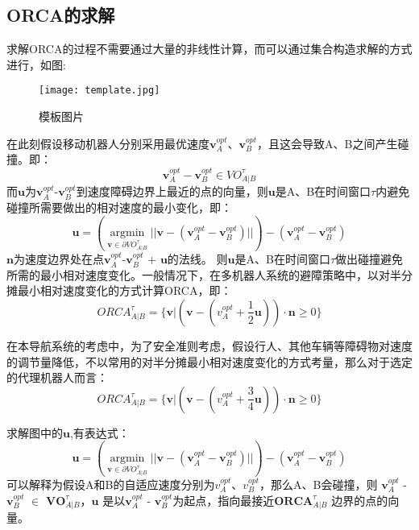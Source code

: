 \subsection{ORCA的求解}
求解ORCA的过程不需要通过大量的非线性计算，而可以通过集合构造求解的方式进行，如图:
\begin{figure}[ht]
    \centering
    \texttt{[image: template.jpg]}
    \caption{模板图片}
\end{figure}
在此刻假设移动机器人分别采用最优速度$\symbf{v}_A^{opt}$、$\symbf{v}_B^{opt}$，且这会导致A、B之间产生碰撞。即：
\begin{equation}
    \symbf{v}_A^{opt} - \symbf{v}_B^{opt} \in  VO^\tau_{A|B}
\end{equation}
而$\symbf{u}$为$\symbf{v}_A^{opt}$-$\symbf{v}_B^{opt}$到速度障碍边界上最近的点的向量，则$\symbf{u}$是A、B在时间窗口$\tau$内避免碰撞所需要做出的相对速度的最小变化，即：
\begin{equation}
    \symbf{u} = ( \mathop{\arg\min}\limits_{\symbf{v} \in \partial VO^\tau_{A|B}} || \symbf{v} - (\symbf{v}_A^{opt}-\symbf{v}_B^{opt})||) - (\symbf{v}_A^{opt}-\symbf{v}_B^{opt})
\end{equation}
$\symbf{n}$为速度边界处在点$\symbf{v}_A^{opt}$-$\symbf{v}_B^{opt}$ + $\symbf{u}$的法线。
则$\symbf{u}$是A、B在时间窗口$\tau$做出碰撞避免所需的最小相对速度变化。一般情况下，在多机器人系统的避障策略中，以对半分摊最小相对速度变化的方式计算ORCA，即：
\begin{equation}
    ORCA^\tau_{A|B} = \{\symbf{v} | (\symbf{v}-(v_A^{opt} + \frac{1}{2}\symbf{u}))\cdot\symbf{n} \geq 0\}
\end{equation}

在本导航系统的考虑中，为了安全准则考虑，假设行人、其他车辆等障碍物对速度的调节量降低，不以常用的对半分摊最小相对速度变化的方式考量，那么对于选定的代理机器人而言：
\begin{equation}
    ORCA^\tau_{A|B} = \{\symbf{v} | (\symbf{v}-(v_A^{opt} + \frac{3}{4}\symbf{u}))\cdot\symbf{n} \geq 0\}
\end{equation}



求解图中的$\symbf{u}$,有表达式：
\begin{equation}
    \symbf{u} = ( \mathop{\arg\min}\limits_{\symbf{v} \in \partial VO^\tau_{A|B}} || \symbf{v} - (\symbf{v}_A^{opt}-\symbf{v}_B^{opt})||) - (\symbf{v}_A^{opt}-\symbf{v}_B^{opt})
\end{equation}
可以解释为假设A和B的自适应速度分别为$v_A^{opt}$、$v_B^{opt}$，那么A、B会碰撞，则
$\symbf{v}_A^{opt}$ - $\symbf{v}_B^{opt}$ $\in$  $\symbf{VO}^\tau_{A|B}$，$\symbf{u}$
是以$\symbf{v}_A^{opt}$ - $\symbf{v}_B^{opt}$为起点，指向最接近$\symbf{ORCA}^\tau_{A|B}$
边界的点的向量。



